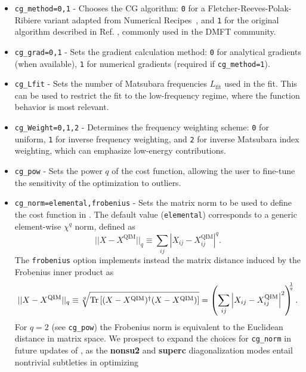 \documentclass[edipack_sp.tex]{subfiles}
\begin{document}
\begin{itemize}
\item \texttt{cg\_method=0,1} - Chooses the CG algorithm: 
\texttt{0} for a Fletcher-Reeves-Polak-Ribiere variant adapted from 
Numerical Recipes~\cite{NumRec77}, and \texttt{1} for the original 
algorithm described in Ref. \cite{Georges1996RMP}, commonly used 
in the DMFT community.
\item \texttt{cg\_grad=0,1} - Sets the gradient calculation method: 
\texttt{0} for analytical gradients (when available), \texttt{1} for 
numerical gradients (required if \texttt{cg\_method=1}).
\item \texttt{cg\_Lfit} - Sets the number of Matsubara frequencies 
$L_\mathrm{fit}$ used in the fit. This can be used to restrict the 
fit to the low-frequency regime, where the function behavior is 
most relevant.
\item \texttt{cg\_Weight=0,1,2} - Determines the frequency weighting 
scheme: \texttt{0} for uniform, \texttt{1} for inverse frequency 
weighting, and \texttt{2} for inverse Matsubara index weighting, which 
can emphasize low-energy contributions.
\item \texttt{cg\_pow} - Sets the power $q$ of the cost function, 
allowing the user to fine-tune the sensitivity of the optimization 
to outliers.
\item \texttt{cg\_norm=elemental,frobenius} - Sets the matrix norm to be used to define the cost function in . The default value (\texttt{elemental}) corresponds to a generic element-wise $\chi^q$ norm, defined as 
\begin{equation*}
    ||X-X^\mathrm{QIM}||_q \equiv {\sum_{ij} \left|X_{ij}-X^\mathrm{QIM}_{ij}\right|^q}.
\end{equation*}
The \texttt{frobenius} option implements instead the matrix distance induced by the Frobenius inner product as
\begin{equation*}
    ||X-X^\mathrm{QIM}||_q \equiv 
    \sqrt[q]{{\rm Tr}\left[(X-X^\mathrm{QIM})^\dagger(X-X^\mathrm{QIM})\right]} =
    \left(\sum_{ij} \left|X_{ij}-X^\mathrm{QIM}_{ij}\right|^2 \right)^{\!\!\!\frac{1}{q}}.
\end{equation*}
For $q=2$ (see \texttt{cg\_pow}) the Frobenius norm is equivalent
to the Euclidean distance in matrix space. 
We prospect to expand the choices for \texttt{cg\_norm} in future updates of \NAME, as the \textbf{nonsu2} and \textbf{superc}
diagonalization modes entail nontrivial subtleties in optimizing 

\end{itemize}
\end{document}

